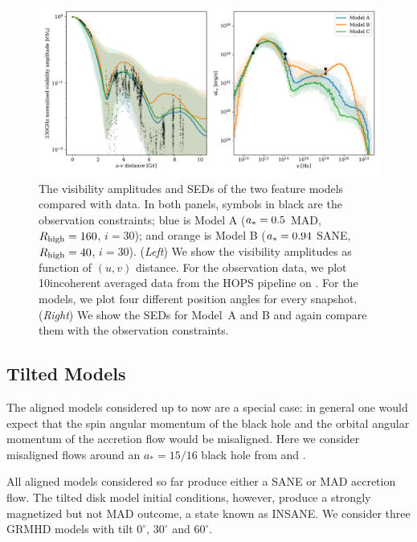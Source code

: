 \begin{figure}
  \centering
  \includegraphics[width=\textwidth]{figures/bestbets.pdf}
  \caption{The visibility amplitudes and SEDs of the two feature
    models compared with data.
    In both panels, symbols in black are the observation constraints;
    blue is Model A ($a_*=0.5$ MAD, $R_\mathrm{high}=160$, $i=30$); and orange is
    Model B ($a_*=0.94$ SANE, $R_\mathrm{high}=40$, $i=30$).
    (\emph{Left}) We show the visibility amplitudes as function of
    $(u, v)$ distance.
    For the observation data, we plot 10\sec incoherent averaged data
    from the HOPS pipeline on \aprilvii.
    For the models, we plot four different position angles for every
    snapshot.
    (\emph{Right}) We show the SEDs for Model~A and B and again
    compare them with the observation constraints.}
  \label{fig:bestbets}
\end{figure}

\subsection{Tilted Models}

The aligned models considered up to now are a special case: in general one would expect that the spin angular momentum of the black hole and the orbital angular momentum of the accretion flow would be misaligned.  Here we consider misaligned flows around an $a_*=15/16$ black hole from \citet{Liska2018} and \citet{Chatterjee2020}.

All aligned models considered so far produce either a SANE or MAD accretion flow.  The tilted disk model initial conditions, however, produce a strongly magnetized but not MAD outcome, a state known as INSANE.  We consider three GRMHD models with tilt $0^{\circ}$, $30^{\circ}$ and $60^{\circ}$.

